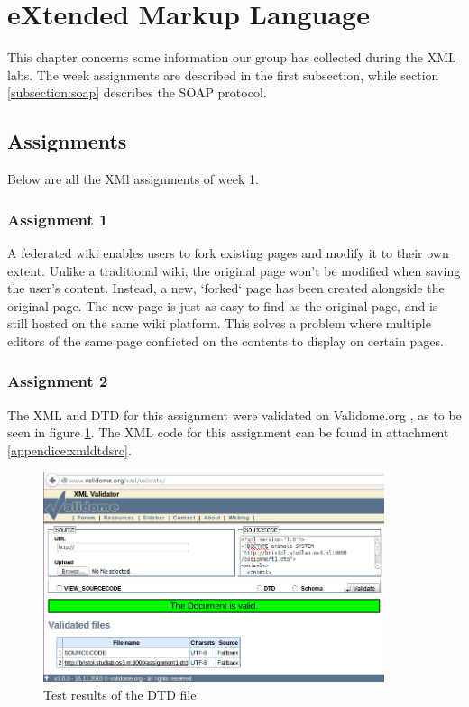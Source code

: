 \section{eXtended Markup Language}
This chapter concerns some information our group has collected during the XML labs. The week assignments are described in the first subsection, while section \ref{subsection:soap} describes the SOAP protocol.

\subsection{Assignments}
Below are all the XMl assignments of week 1.

\subsubsection{Assignment 1}
 A federated wiki enables users to fork existing pages and modify it to their own extent. Unlike a traditional wiki, the original page won't be modified when saving the user's content. Instead, a new, `forked` page has been created alongside the original page. The new page is just as easy to find as the original page, and is still hosted on the same wiki platform. This solves a problem where multiple editors of the same page conflicted on the contents to display on certain pages.

\subsubsection{Assignment 2}
The XML and DTD for this assignment were validated on Validome.org , as to be seen in figure \ref{fig:xmldtdtest}. The XML code for this assignment can be found in attachment \ref{appendice:xmldtdsrc}.
\begin{figure}[H]
	\centering
	\includegraphics[width=100mm]{img/xmldtdtest.png}
	\caption{Test results of the DTD file}\label{fig:xmldtdtest}
\end{figure}

